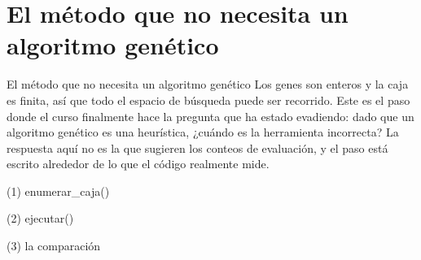
\section{El método que no necesita un algoritmo genético}

\begin{frame}{El método que no necesita un algoritmo genético}
Los genes son enteros y la caja es finita, así que todo el espacio de búsqueda puede
ser recorrido. Este es el paso donde el curso finalmente hace la pregunta que ha estado
evadiendo: dado que un algoritmo genético es una heurística, ¿cuándo es la herramienta
incorrecta? La respuesta aquí no es la que sugieren los conteos de evaluación, y el
paso está escrito alrededor de lo que el código realmente mide.
\end{frame}

\begin{frame}[fragile]{(1) enumerar\_caja()}

\end{frame}

\begin{frame}[fragile]{(2) ejecutar()}

\end{frame}

\begin{frame}[fragile]{(3) la comparación}

\end{frame}


